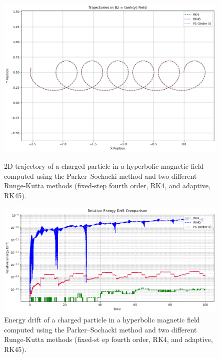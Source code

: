 \documentclass{article}
\begin{document}
\begin{figure}[H]
    \centering
    \begin{minipage}[t]{0.4\textwidth}
        \centering
        \includegraphics[width=\textwidth]{Images/hyper/Hyper_traj_qm1_alpha1_100s_PS_Order5.png}
        \caption{2D trajectory of a charged particle in a hyperbolic magnetic field computed using the Parker–Sochacki method and two different Runge-Kutta methods (fixed-step fourth order, RK4, and adaptive, RK45).}
        \label{FIG:Hyper_Traj_100s}
    \end{minipage}%
    \hfill
    \begin{minipage}[t]{0.45\textwidth}
        \centering
        \includegraphics[width=\textwidth]{Images/hyper/Hyper_energydrif_qm1_alpha1_100s_PS_Order5.png}
        \caption{Energy drift of a charged particle in a hyperbolic magnetic field computed using the Parker–Sochacki method and two different Runge-Kutta methods (fixed-st
        ep fourth order, RK4, and adaptive, RK45).}
        \label{FIG:Hyper_Error_100s}
    \end{minipage}
\end{figure}
\end{document}
